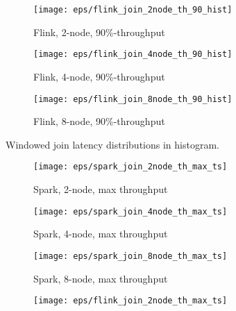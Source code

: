 {\begin{figure*}
   \begin{subfigure}[b]{0.3\textwidth}
       \texttt{[image: eps/flink\_join\_2node\_th\_90\_hist]}

       \caption{Flink, 2-node,  90\%-throughput}
   \end{subfigure}%
   \begin{subfigure}[b]{0.3\textwidth}
       \texttt{[image: eps/flink\_join\_4node\_th\_90\_hist]}

       \caption{Flink, 4-node,  90\%-throughput }
   \end{subfigure}%
   \begin{subfigure}[b]{0.3\textwidth}
       \texttt{[image: eps/flink\_join\_8node\_th\_90\_hist]}

       \caption{Flink, 8-node,  90\%-throughput }
   \end{subfigure}

        \caption{Windowed join latency distributions in histogram.}
                \label{fig_hist_join}
\end{figure*}








\begin{figure*}
    \centering
   \begin{subfigure}[b]{0.3\textwidth}
       \texttt{[image: eps/spark\_join\_2node\_th\_max\_ts]}

       \caption{Spark, 2-node, max  throughput}
       \label{fig_spark_join_2node_th_max_ts}
   \end{subfigure}%
   \begin{subfigure}[b]{0.3\textwidth}
       \texttt{[image: eps/spark\_join\_4node\_th\_max\_ts]}

       \caption{Spark, 4-node, max  throughput }
              \label{fig_spark_join_4node_th_max_ts}
   \end{subfigure}%
   \begin{subfigure}[b]{0.3\textwidth}
       \texttt{[image: eps/spark\_join\_8node\_th\_max\_ts]}

       \caption{Spark, 8-node, max  throughput }
              \label{fig_spark_join_8node_th_max_ts}
   \end{subfigure}




   \begin{subfigure}[b]{0.3\textwidth}
       \texttt{[image: eps/flink\_join\_2node\_th\_max\_ts]}


\end{subfigure}
\end{figure*}}

